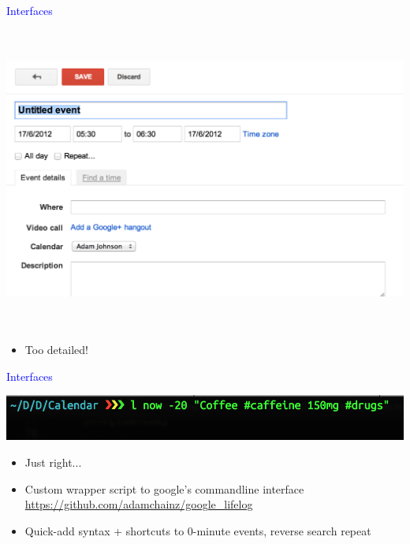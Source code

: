 \documentclass[landscape]{slides}
\begin{document}
\begin{slide}

    \textcolor{blue}{\Large{Interfaces}}

    \includegraphics[height=10cm]{google-calendar-add2}

    \begin{itemize}
        \item Too detailed!
    \end{itemize}

\end{slide}


\begin{slide}

    \textcolor{blue}{\Large{Interfaces}}

    \includegraphics[width=18cm]{cli-calendar-add}

    \begin{itemize}
        \item Just right...

        \item Custom wrapper script to google's commandline interface \newline
        \url{https://github.com/adamchainz/google\_lifelog}

        \item Quick-add syntax + shortcuts to 0-minute events, reverse search repeat
    \end{itemize}

\end{slide}
\end{document}

